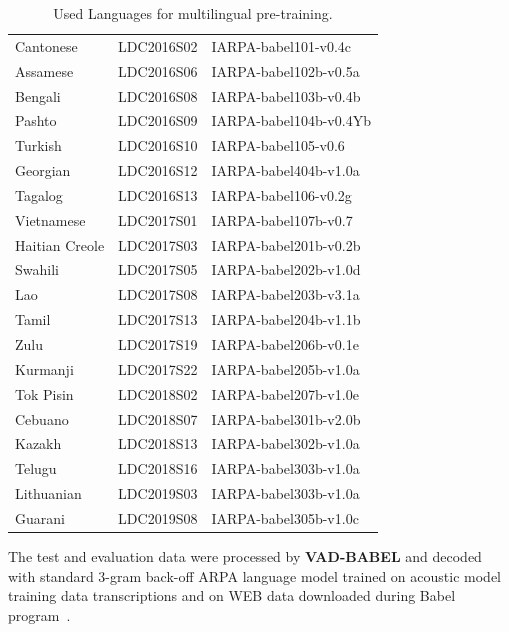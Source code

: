\documentclass{article}
\begin{document}
\begin{table}[ht]
\begin{tabular}{|l|l|l|}
\hline
Cantonese & LDC2016S02 & IARPA-babel101-v0.4c \\
Assamese  & LDC2016S06 & IARPA-babel102b-v0.5a\\
Bengali   & LDC2016S08 & IARPA-babel103b-v0.4b\\
Pashto    & LDC2016S09 & IARPA-babel104b-v0.4Yb\\
Turkish   & LDC2016S10 & IARPA-babel105-v0.6 \\
Georgian & LDC2016S12  & IARPA-babel404b-v1.0a \\
Tagalog   & LDC2016S13 & IARPA-babel106-v0.2g \\
Vietnamese& LDC2017S01 & IARPA-babel107b-v0.7 \\
Haitian Creole         & LDC2017S03 & IARPA-babel201b-v0.2b\\
Swahili  & LDC2017S05  & IARPA-babel202b-v1.0d \\
Lao      & LDC2017S08  & IARPA-babel203b-v3.1a \\
Tamil    & LDC2017S13  & IARPA-babel204b-v1.1b \\
Zulu     & LDC2017S19  & IARPA-babel206b-v0.1e \\
Kurmanji & LDC2017S22  & IARPA-babel205b-v1.0a \\
Tok Pisin & LDC2018S02 & IARPA-babel207b-v1.0e \\
Cebuano  & LDC2018S07  & IARPA-babel301b-v2.0b \\
Kazakh   & LDC2018S13  & IARPA-babel302b-v1.0a \\
Telugu   & LDC2018S16  & IARPA-babel303b-v1.0a \\
Lithuanian & LDC2019S03 &  IARPA-babel303b-v1.0a \\
Guarani  & LDC2019S08  & IARPA-babel305b-v1.0c \\
\hline
\end{tabular}
  \caption{Used Languages for multilingual pre-training.}
  \label{tab:data}
\end{table}


The test and evaluation data were processed by {\bf VAD-BABEL} and
decoded with standard 3-gram back-off ARPA language model trained on acoustic model training data transcriptions and on WEB data downloaded during Babel program~\cite{zhang:IS2015:webdata}.
\end{document}
